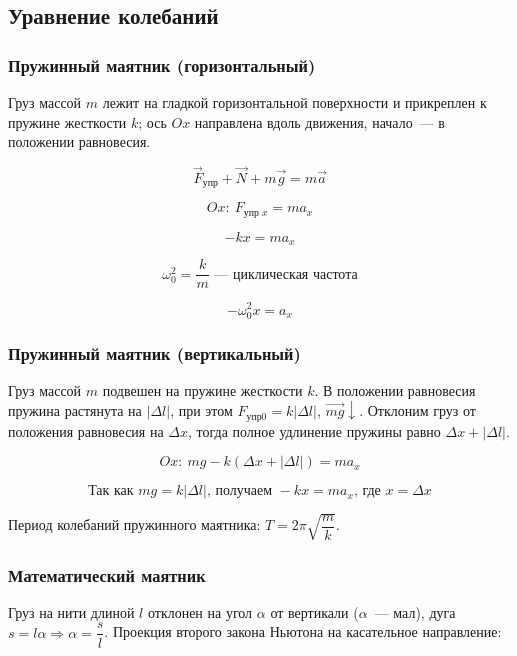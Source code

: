 \documentclass[12pt]{article}
\begin{document}
	\subsection{Уравнение колебаний}
	
	\subsubsection{Пружинный маятник (горизонтальный)}
	
	Груз массой $m$ лежит на гладкой горизонтальной поверхности и прикреплен к пружине жесткости $k$; ось $Ox$ направлена вдоль движения, начало~--- в положении равновесия.
	
	\[ \vec{F}_{\text{упр}} + \vec{N} + m\vec{g} = m\vec{a} \]
	
	\[ Ox: \ F_{\text{упр }x} = ma_x \]
	
	\[-kx = ma_x\]
	
	\[ \omega_0^2 = \dfrac{k}{m} \text{~--- циклическая частота} \]
	
	\[ -\omega_0^2 x = a_x \]
	
	\subsubsection{Пружинный маятник (вертикальный)}
	
	Груз массой $m$ подвешен на пружине жесткости $k$. В положении равновесия пружина растянута на $|\varDelta l|$, при этом $F_{\text{упр}0} = k|\varDelta l|$, $\vec{mg} \downarrow$. Отклоним груз от положения равновесия на $\varDelta x$, тогда полное удлинение пружины равно $\varDelta x + |\varDelta l|$.
	
	\[ Ox: \ mg - k(\varDelta x + |\varDelta l|) = ma_x \]
	
	\[ \text{Так как } mg = k|\varDelta l| \text{, получаем } -kx = ma_x \text{, где } x = \varDelta x\]
	
	\begin{statement}
		Период колебаний пружинного маятника: $T = 2\pi \sqrt{\dfrac{m}{k}}$.
	\end{statement}
	
	\subsubsection{Математический маятник}
	
	Груз на нити длиной $l$ отклонен на угол $\alpha$ от вертикали ($\alpha$~--- мал), дуга $s = l\alpha \Rightarrow \alpha = \dfrac{s}{l}$. Проекция второго закона Ньютона на касательное направление:
	
\end{document}
